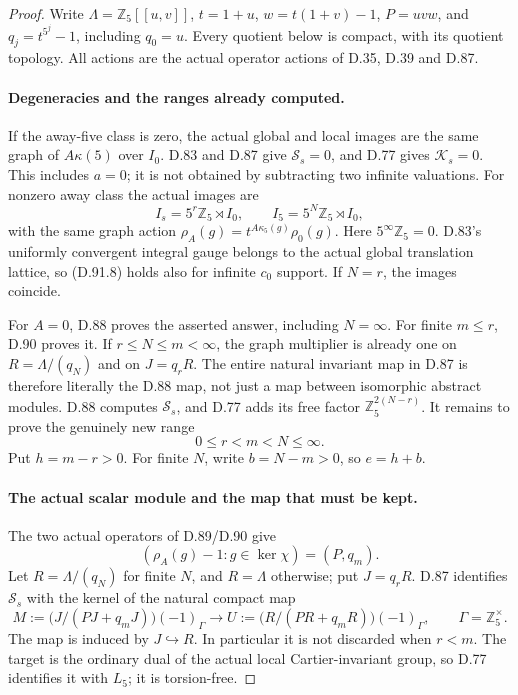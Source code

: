 \begin{proof}
Write \(\Lambda=\mathbb Z_5[[u,v]]\), \(t=1+u\),
\(w=t(1+v)-1\), \(P=uvw\), and \(q_j=t^{5^j}-1\),
including \(q_0=u\). Every quotient below is compact,
with its quotient topology. All actions are the actual
operator actions of D.35, D.39 and D.87.

\paragraph{Degeneracies and the ranges already computed.}
If the away-five class is zero, the actual global and local
images are the same graph of \(A\kappa(5)\) over \(I_0\).
D.83 and D.87 give \(\mathcal S_s=0\), and D.77 gives
\(\mathcal K_s=0\). This includes \(a=0\); it is not
obtained by subtracting two infinite valuations.
For nonzero away class the actual images are
\[
 I_s=5^r\mathbb Z_5\rtimes I_0,\qquad
 I_5=5^N\mathbb Z_5\rtimes I_0,
                                                               \tag{D.91.8}
\]
with the same graph action
\(\rho_A(g)=t^{A\kappa_5(g)}\rho_0(g)\).
Here \(5^\infty\mathbb Z_5=0\). D.83's uniformly
convergent integral gauge belongs to the actual global
translation lattice, so (D.91.8) holds also for infinite
\(c_0\) support. If \(N=r\), the images coincide.

For \(A=0\), D.88 proves the asserted answer, including
\(N=\infty\). For finite \(m\le r\), D.90 proves it.
If \(r\le N\le m<\infty\), the graph multiplier is
already one on \(R=\Lambda/(q_N)\) and on \(J=q_rR\).
The entire natural invariant map in D.87 is therefore
literally the D.88 map, not just a map between isomorphic
abstract modules. D.88 computes \(\mathcal S_s\), and
D.77 adds its free factor \(\mathbb Z_5^{2(N-r)}\).
It remains to prove the genuinely new range
\[
                 0\le r<m<N\le\infty.
                                                               \tag{D.91.9}
\]
Put \(h=m-r>0\). For finite \(N\), write \(b=N-m>0\),
so \(e=h+b\).

\paragraph{The actual scalar module and the map that must be kept.}
The two actual operators of D.89/D.90 give
\[
       (\rho_A(g)-1:g\in\ker\chi)=(P,q_m).
                                                               \tag{D.91.10}
\]
Let \(R=\Lambda/(q_N)\) for finite \(N\), and \(R=\Lambda\)
otherwise; put \(J=q_rR\). D.87 identifies \(\mathcal S_s\)
with the kernel of the natural compact map
\[
 M:=\bigl(J/(PJ+q_mJ)\bigr)(-1)_\Gamma
       \longrightarrow
 U:=\bigl(R/(PR+q_mR)\bigr)(-1)_\Gamma,
 \qquad \Gamma=\mathbb Z_5^\times.
                                                               \tag{D.91.11}
\]
The map is induced by \(J\hookrightarrow R\).
In particular it is not discarded when \(r<m\).
The target is the ordinary dual of the actual local
Cartier-invariant group, so D.77 identifies it with
\(L_5\); it is torsion-free.


\end{proof}
